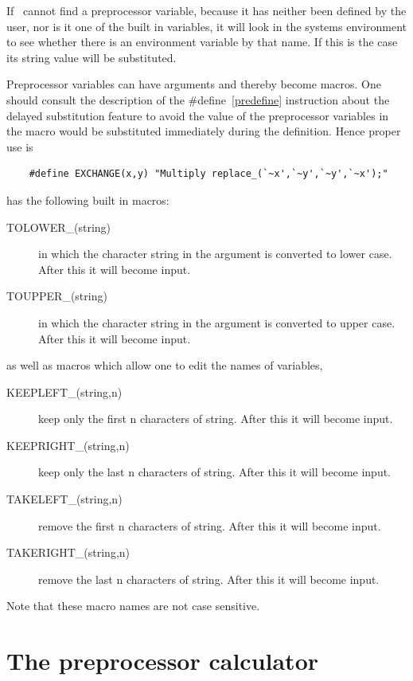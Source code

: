 \noindent If \FORM\ cannot find a preprocessor variable, because it has 
neither been defined by the user, nor is it one of the built in variables, 
it will look in the systems environment to see whether 
there is an environment variable by that name. If this is the case its 
string value will be substituted.

\noindent Preprocessor variables can have arguments and thereby become 
macros. One should consult the description of the \#define~\ref{predefine} 
instruction about the delayed substitution feature to avoid the value of 
the preprocessor variables in the macro would be substituted immediately 
during the definition. Hence proper use is
\begin{verbatim}
    #define EXCHANGE(x,y) "Multiply replace_(`~x',`~y',`~y',`~x');"
\end{verbatim}

\noindent \FORM{} has the following built in macros:
\begin{description}
\item[TOLOWER\_(string)] in which the character string in the argument is 
converted to lower case. After this it will become input.
\item[TOUPPER\_(string)] in which the character string in the argument is 
converted to upper case. After this it will become input.
\end{description}
as well as macros which allow one to edit the names of variables,
\begin{description}
\item[KEEPLEFT\_(string,n)] keep only the first n characters of string.
After this it will become input.
\item[KEEPRIGHT\_(string,n)] keep only the last n characters of string.
After this it will become input.
\item[TAKELEFT\_(string,n)] remove the first n characters of string.
After this it will become input.
\item[TAKERIGHT\_(string,n)] remove the last n characters of string.
After this it will become input.
\end{description}
Note that these macro names are not case sensitive.

\section{The preprocessor calculator}
\label{calculator}

